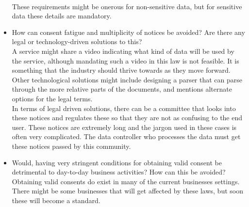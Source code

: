 \begin{itemize}
	\\
	These requirements might be onerous for non-sensitive data, but for sensitive data these details are mandatory.
	\item How can consent fatigue and multiplicity of notices be avoided? Are there any legal or technology-driven solutions to this?
	\\
	A service might share a video indicating what kind of data will be used by the service, although mandating such a video in this law is not feasible. It is something that the industry should thrive towards as they move forward. Other technological solutions might include designing a parser that can parse through the more relative parts of the documents, and mentions alternate options for the legal terms.
	\\
	In terms of legal driven solutions, there can be a committee that looks into these notices and regulates these so that they are not as confusing to the end user. These notices are extremely long and the jargon used in these cases is often very complicated. The data controller who processes the data must get these notices passed by this community.
	\item Would, having very stringent conditions for obtaining valid consent be detrimental to day-to-day business activities? How can this be avoided?
	\\
	Obtaining valid consents do exist in many of the current businesses settings. There might be some businesses that will get affected by these laws, but soon these will become a standard.
\end{itemize}
